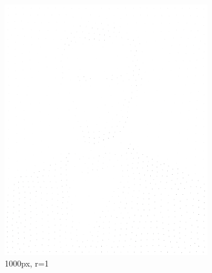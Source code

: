 \documentclass[11pt]{article}
\begin{document}
\begin{figure}[H]
	\centering
	\begin{subfigure}[b]{0.2\linewidth}
		\includegraphics[width=\linewidth]{pix/hc_AL_1000_r1.png}
		\caption{1000px, r=1}
	\end{subfigure}
	\begin{subfigure}[b]{0.2\linewidth}

\end{subfigure}
\end{figure}
\end{document}
